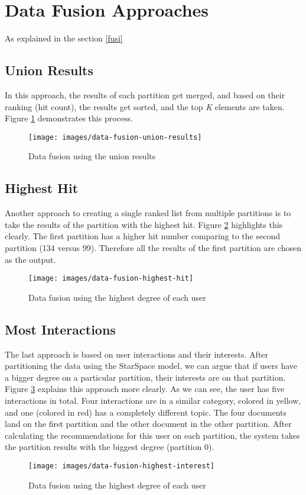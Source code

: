 \section{Data Fusion Approaches}
\label{sec:data-fusion-approaches}
As explained in the section \ref{fusi}

\subsection{Union Results}
\label{subsec:data-fusion-union-results}
In this approach, the results of each partition get merged, and based on their ranking (hit count), the results get sorted, and the top \emph{K} elements are taken. Figure \ref{fig:data-fusion-union-results} demonstrates this process.


\begin{figure}[!h]
	\centering
	\texttt{[image: images/data-fusion-union-results]}
	\caption{Data fusion using the union results}
	\label{fig:data-fusion-union-results}
\end{figure}

\subsection{Highest Hit}
\label{subsec:data-fusion-highest-hit}
Another approach to creating a single ranked list from multiple partitions is to take the results of the partition with the highest hit. Figure \ref{fig:data-fusion-highest-hit} highlights this clearly. The first partition has a higher hit number comparing to the second partition (134 versus 99). Therefore all the results of the first partition are chosen as the output.
\begin{figure}[!h]
	\centering
	\texttt{[image: images/data-fusion-highest-hit]}
	\caption{Data fusion using the highest degree of each user}
	\label{fig:data-fusion-highest-hit}
\end{figure}

\subsection{Most Interactions}
\label{subsec:data-fusion-most-interactions}
The last approach is based on user interactions and their interests. After partitioning the data using the StarSpace model, we can argue that if users have a bigger degree on a particular partition, their interests are on that partition. Figure \ref{fig:data-fusion-highest-ineterest} explains this approach more clearly. As we can see, the user has five interactions in total. Four interactions are in a similar category, colored in yellow, and one (colored in red) has a completely different topic. The four documents land on the first partition and the other document in the other partition. After calculating the recommendations for this user on each partition, the system takes the partition results with the biggest degree (partition 0).
\begin{figure}[!h]
	\centering
	\texttt{[image: images/data-fusion-highest-interest]}
	\caption{Data fusion using the highest degree of each user}
	\label{fig:data-fusion-highest-ineterest}
\end{figure}
